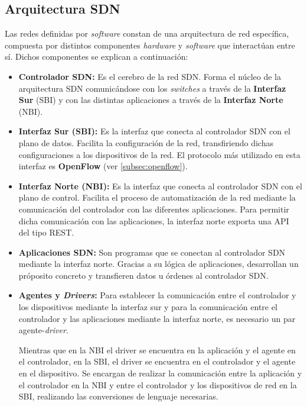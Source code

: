 \subsection{Arquitectura SDN}

Las redes definidas por \textit{software} constan de una arquitectura de red específica, compuesta por distintos componentes \textit{hardware} y \textit{software} que interactúan entre sí. Dichos componentes se explican a continuación:


\begin{itemize}
	\item \textbf{Controlador \ac{SDN}:} Es el cerebro de la red \ac{SDN}. Forma el núcleo de la arquitectura \ac{SDN} comunicándose con los \textit{switches} a través de la \textbf{Interfaz Sur} (\ac{SBI}) y con las distintas aplicaciones a través de la \textbf{Interfaz Norte} (\ac{NBI}).
	
	\item \textbf{Interfaz Sur (\ac{SBI}):} Es la interfaz que conecta al controlador \ac{SDN} con el plano de datos. Facilita la configuración de la red, transfiriendo dichas configuraciones a los dispositivos de la red. El protocolo más utilizado en esta interfaz es \textbf{OpenFlow} (ver \ref{subsec:openflow}).
	
	\item \textbf{Interfaz Norte (\ac{NBI}):} Es la interfaz que conecta al controlador \ac{SDN} con el plano de control. Facilita el proceso de automatización de la red mediante la comunicación del controlador con las diferentes aplicaciones. Para permitir dicha comunicación con las aplicaciones, la interfaz norte exporta una \ac{API} del tipo \ac{REST}.
	
	\item \textbf{Aplicaciones \ac{SDN}:} Son programas que se conectan al controlador \ac{SDN} mediante la interfaz norte. Gracias a su lógica de aplicaciones, desarrollan un próposito concreto y transfieren datos u órdenes al controlador \ac{SDN}.
	
	\item \textbf{Agentes y \textit{Drivers}:} Para establecer la comunicación entre el controlador y los dispositivos mediante la interfaz sur y para la comunicación entre el controlador y las aplicaciones mediante la interfaz norte, es necesario un par agente-\textit{driver}. 
	
	Mientras que en la \ac{NBI} el driver se encuentra en la aplicación y el agente en el controlador, en la \ac{SBI}, el driver se encuentra en el controlador y el agente en el dispositivo. Se encargan de realizar la comunicación entre la aplicación y el controlador en la \ac{NBI} y entre el controlador y los dispositivos de red en la \ac{SBI}, realizando las conversiones de lenguaje necesarias.
\end{itemize}


